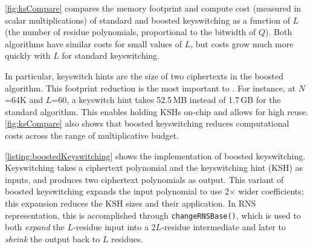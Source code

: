 \autoref{fig:ksCompare} compares the memory footprint and compute cost (measured in scalar multiplications)
of standard and boosted keyswitching as a function of $L$ (the number of residue polynomials,
proportional to the bitwidth of $Q$).
Both algorithms have similar costs for small values of $L$, but costs
grow much more quickly with $L$ for standard keyswitching.

In particular, keyswitch hints are the size of
two
ciphertexts in the boosted algorithm.
This footprint reduction is the most important to \name.
For instance, at $N$=64K and $L$=60,
a keyswitch hint takes 52.5\,MB
instead of 1.7\,GB for the standard algorithm.
This enables holding KSHs on-chip and allows for high reuse.
%
\autoref{fig:ksCompare} also shows that boosted keyswitching reduces computational
costs across the range of multiplicative budget.

\autoref{listing:boostedKeyswitching} shows the implementation of boosted keyswitching.
Keyswitching takes a ciphertext polynomial and the keyswitching hint (KSH) as inputs,
and %
produces two ciphertext polynomials as output.
This variant of boosted keyswitching expands the input polynomial to use 2$\times$ wider coefficients;
this expansion reduces the KSH sizes and their application.
In RNS representation, this is accomplished through \verb!changeRNSBase()!,
which is used to both \emph{expand} the $L$-residue input into a $2L$-residue intermediate and later to \emph{shrink} the output
back to $L$ residues.



